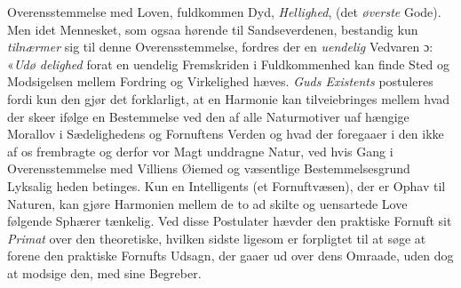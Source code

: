 \documentclass[12pt,a4paper]{book}
\begin{document}
Overensstemmelse med Loven, fuldkommen Dyd, \emph{Hellighed},
(det \emph{øverste} Gode). Men idet Mennesket, som ogsaa hørende
til Sandseverdenen, bestandig kun \emph{tilnærmer} sig til denne
Overensstemmelse, fordres der en \emph{uendelig} Vedvaren ɔ: «\emph{Udø\-%
delighed} forat en uendelig Fremskriden i Fuldkommenhed
kan finde Sted og Modsigelsen mellem Fordring og Virkelighed
hæves. \emph{Guds Existents} postuleres fordi kun den gjør det
forklarligt, at en Harmonie kan tilveiebringes mellem hvad der
skeer ifølge en Bestemmelse ved den af alle Naturmotiver uaf\-%
hængige Morallov i Sædelighedens og Fornuftens Verden og
hvad der foregaaer i den ikke af os frembragte og derfor vor
Magt unddragne Natur, ved hvis Gang i Overensstemmelse med
Villiens Øiemed og væsentlige Bestemmelsesgrund Lyksalig\-%
heden betinges. Kun en Intelligents (et Fornuftvæsen), der
er Ophav til Naturen, kan gjøre Harmonien mellem de to ad\-%
skilte og uensartede Love følgende Sphærer tænkelig. Ved
disse Postulater hævder den praktiske Fornuft sit \emph{Primat}
over den theoretiske, hvilken sidste ligesom er forpligtet til at
søge at forene den praktiske Fornufts Udsagn, der gaaer ud
over dens Omraade, uden dog at modsige den, med sine
Begreber.
\end{document}
